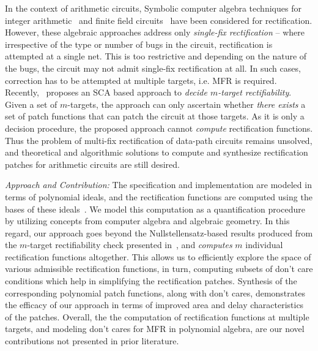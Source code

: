 In the context of arithmetic circuits, Symbolic computer algebra 
techniques for integer arithmetic~\cite{farimah:2017:1,MF_Rolf:ISVLSI18} and
finite field circuits~\cite{Utkarsh:VLSI18,Vkrao:FMCAD18}
have been considered for rectification. However, these algebraic
approaches address only {\it single-fix rectification} -- where
irrespective of the type or number of bugs in the circuit,
rectification is attempted at a single net. This is too restrictive
and depending on the nature of the bugs, the circuit may not admit
single-fix rectification at all. In such cases, correction has to be
attempted at multiple targets, i.e. MFR is required.
Recently,~\cite{Vkrao:ISQED21} proposes an SCA based approach to 
{\it decide $m$-target rectifiability}. Given a set of $m$-targets,
the approach can only ascertain whether {\it there exists} a set of
patch functions that can patch the circuit at those targets. As 
it is only a decision procedure, the proposed approach cannot 
{\it compute} rectification functions.
Thus the problem of multi-fix rectification of data-path circuits
remains unsolved, and theoretical and algorithmic solutions to compute
and synthesize rectification patches for arithmetic circuits are still
desired. 

{\it Approach and Contribution:}
The specification and implementation are modeled in terms of polynomial ideals, and
the rectification functions are computed using the \Grobner bases of these ideals~\cite{gb_book}.
We model this computation as a quantification procedure by utilizing
concepts from computer algebra and algebraic geometry. 
In this regard, our approach goes beyond
the Nullstellensatz-based results produced from the $m$-target
rectifiability check presented in~\cite{Vkrao:ISQED21}, and {\it computes}
$m$ individual rectification functions altogether. This allows us to
efficiently explore the space of various admissible rectification
functions, in turn, computing subsets of don't care conditions
which help in simplifying the rectification patches. Synthesis of the 
corresponding polynomial patch functions, along with don't cares,  
demonstrates the efficacy of our approach in terms of improved area 
and delay characteristics of the patches.
Overall, the  the computation of rectification functions at multiple
targets, and modeling don't cares for MFR in
polynomial algebra, are our novel contributions not presented
in prior literature. 

